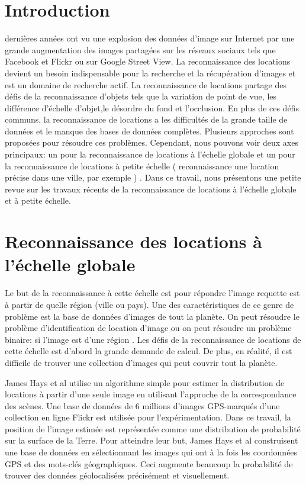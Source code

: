 \documentclass[journal]{IEEEtran}
\begin{document}
\section{Introduction}
 dernières années ont vu une explosion des données d'image sur 
Internet par une 
grande augmentation des images partagées sur les réseaux sociaux tels que Facebook et 
Flickr ou sur Google Street View. La reconnaissance des locations devient un besoin 
indispensable pour la recherche et la récupération d'images et est un domaine de 
recherche actif. La reconnaissance de locations partage des défis de la reconnaissance 
d'objets tels que la variation de point de vue, les différence d'échelle 
d'objet,le désordre du fond et l'occlusion. En plus de ces défis communs, la 
reconnaissance de locations a les difficultés de la grande taille de données et le manque 
des bases de données complètes. Plusieurs approches sont proposées pour résoudre ces
problèmes. Cependant, nous pouvons voir deux axes principaux: un pour la reconnaissance 
de locations à l'échelle globale \cite{Hays:2008:im2gps, gopalan2013learning} et un pour 
la reconnaissance de locations à petite échelle ( reconnaissance une location précise 
dans une ville, par exemple ) \cite{torii2013visual, sattler2012improving, cao2013graph}. 
Dans ce travail, nous présentons une petite revue sur les travaux récents de la 
reconnaissance de locations à l'échelle globale et à petite échelle. 

\section{Reconnaissance des locations à l'échelle globale}
Le but de la reconnaissance à cette échelle est pour répondre l'image requette est à 
partir de quelle région (ville ou pays). Une des caractéristiques de ce genre de problème 
est la base de données d'images de tout la planète. On peut résoudre le problème 
d'identification de location d'image \cite{Hays:2008:im2gps, gopalan2013learning} ou on 
peut résoudre un problème binaire: si l'image est d'une région \cite{doersch2012what}. 
Les défis de la reconnaissance de locations de cette échelle est d'abord la grande 
demande de calcul. De plus, en réalité, il est difficile de trouver une collection 
d'images qui peut couvrir tout la planète. %

James Hays et al \cite{Hays:2008:im2gps} utilise un algorithme simple pour estimer la 
distribution de locations à partir d'une seule image en utilisant l'approche de 
la correspondance des scènes. Une base de données de 6 millions d'images GPS-marqués 
d'une collection en ligne Flickr est utilisée pour l'expérimentation. Dans ce travail, la 
position de l'image estimée est représentée comme une distribution de probabilité sur la 
surface de la Terre. Pour atteindre leur but, James Hays et al construisent une base de 
données en sélectionnant les images qui ont à la fois les coordonnées GPS et des 
mots-clés géographiques. Ceci augmente beaucoup la probabilité de trouver des données 
géolocalisées précisément et visuellement.
\end{document}
